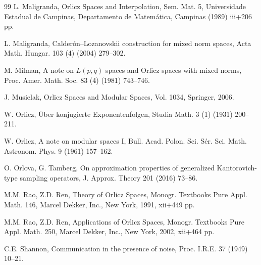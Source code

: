 \documentclass[11pt, a4paper]{article}
\theoremstyle{definition}
\numberwithin{equation}{section}
\def\RR{\mathbb R}
\begin{document}
\begin{thebibliography}{99}
 L. Maligranda, Orlicz Spaces and Interpolation, Sem. Mat. 5, Universidade Estadual de Campinas, Departamento de Matemática, Campinas (1989) iii+206 pp.

L. Maligranda, Calderón–Lozanovskii construction for mixed norm spaces, Acta Math. Hungar. 103 (4) (2004) 279–302.


 M. Milman, A note on $L(p,q)$ spaces and Orlicz spaces with mixed norms, Proc. Amer. Math. Soc. 83 (4) (1981) 743–746.

 J. Musielak, Orlicz Spaces and Modular Spaces, Vol. 1034, Springer, 2006.

 W. Orlicz, Über konjugierte Exponentenfolgen, Studia Math. 3 (1) (1931) 200–211.

 W. Orlicz, A note on modular spaces I, Bull. Acad. Polon. Sci. Sér. Sci. Math. Astronom. Phys. 9 (1961) 157–162.

 O. Orlova, G. Tamberg, On approximation properties of generalized Kantorovich-type sampling operators, J. Approx. Theory 201 (2016) 73–86.



 M.M. Rao, Z.D. Ren, Theory of Orlicz Spaces, Monogr. Textbooks Pure Appl. Math. 146, Marcel Dekker, Inc., New York, 1991, xii+449 pp.

 M.M. Rao, Z.D. Ren, Applications of Orlicz Spaces, Monogr. Textbooks Pure Appl. Math. 250, Marcel Dekker, Inc., New York, 2002, xii+464 pp.



 C.E. Shannon, Communication in the presence of noise, Proc. I.R.E. 37 (1949) 10–21.







		\end{thebibliography}
	
	
	
\end{document}
